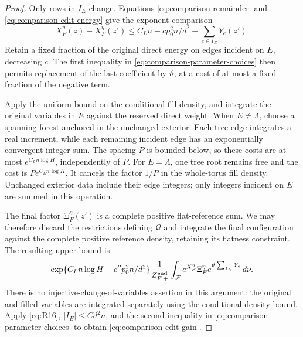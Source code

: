 \begin{proof}
Only rows in \(I_E\) change.  Equations
\eqref{eq:comparison-remainder} and \eqref{eq:comparison-edit-energy}
give the exponent comparison
\[
 X_F^\eta(z)-X_F^\eta(z')
 \le C_Ln-cp_0^2n/d^2+\sum_{e\in I_E}Y_e(z').
\]
Retain a fixed fraction of the original direct energy on edges incident
on \(E\), decreasing \(c\).  The first inequality in
\eqref{eq:comparison-parameter-choices} then permits replacement of
the last coefficient by \(\vartheta\), at a cost of at most a fixed
fraction of the negative term.

Apply the uniform bound on the conditional fill density, and integrate
the original variables in \(E\) against the reserved direct weight.
When \(E\ne\Lambda\), choose a spanning forest anchored in the unchanged
exterior.  Each tree edge integrates a real increment, while each
remaining incident edge has an exponentially convergent integer sum.
The spacing \(P\) is bounded below, so these costs are at most
\(e^{C_Ln\log H}\), independently of \(P\).  For \(E=\Lambda\), one
tree root remains free and the cost is
\(Pe^{C_Ln\log H}\).  It cancels the factor \(1/P\) in the whole-torus
fill density.  Unchanged exterior data include their edge integers;
only integers incident on \(E\) are summed in this operation.

The final factor \(\Xi_F^\eta(z')\) is a complete positive flat-reference
sum.  We may therefore discard the restrictions defining \(\mathcal Q\)
and integrate the final configuration against the complete positive
reference density, retaining its flatness constraint.  The resulting
upper bound is
\[
 \exp\{C_Ln\log H-c''p_0^2n/d^2\}
 \frac1{Z_{F,+}^{\rm end}}
 \int_{\mathcal F}e^{X_F^\eta}\Xi_F^\eta
       e^{\vartheta\sum_{I_E}Y_e}\,d\nu.
\]
There is no injective-change-of-variables assertion in this argument:
the original and filled variables are integrated separately using the
conditional-density bound.  Apply \eqref{eq:R16},
\(|I_E|\le Cd^2n\), and the second inequality in
\eqref{eq:comparison-parameter-choices} to obtain
\eqref{eq:comparison-edit-gain}.
\end{proof}

